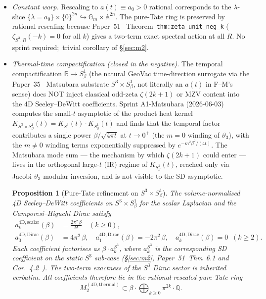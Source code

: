 \documentclass[11pt,a4paper]{article}
\theoremstyle{plain}
\newtheorem{proposition}[theorem]{Proposition}
\theoremstyle{definition}
\newcommand{\sthree}{S^{3}}
\newcommand{\R}{\mathbb{R}}
\newcommand{\Q}{\mathbb{Q}}
\begin{document}
\begin{itemize}
  \item \textit{Constant warp.}  Rescaling to $a(t) \equiv a_0 > 0$
    rational corresponds to the $\lambda$-slice
    $\{\lambda = a_0\} \times \{0\}^{2n} \hookrightarrow
    \mathbb{G}_m \times \mathbb{A}^{2n}$.  The pure-Tate ring is preserved
    by rational rescaling because Paper~51~\cite{loutey_paper51}
    Theorem~\texttt{thm:zeta\_unit\_neg\_k} ($\zeta_{\sthree, R}(-k) = 0$
    for all $k$) gives a two-term exact spectral action at all $R$.  No
    sprint required;\ trivial corollary of \S\ref{sec:m2}.
  \item \textit{Thermal-time compactification (closed in the negative).}
    The temporal compactification $\R \to S^1_\beta$ (the natural GeoVac
    time-direction surrogate via the Paper~35~\cite{loutey_paper35} Matsubara
    substrate $\sthree \times S^1_\beta$, not literally an $a(t)$ in F--M's
    sense) does NOT inject classical odd-zeta $\zeta(2k+1)$ or MZV content
    into the 4D Seeley--DeWitt coefficients.  Sprint A1-Matsubara
    (2026-06-03) computes the
    small-$t$ asymptotic of the product heat kernel
    $K_{\sthree \times S^1_\beta}(t) = K_{\sthree}(t) \cdot K_{S^1_\beta}(t)$
    and finds that the temporal factor contributes a single power
    $\beta/\sqrt{4\pi t}$ at $t \to 0^+$ (the $m = 0$ winding of
    $\vartheta_3$), with the $m \neq 0$ winding terms exponentially
    suppressed by $e^{-m^2\beta^2/(4t)}$.  The Matsubara mode sum --- the
    mechanism by which $\zeta(2k+1)$ could enter --- lives in the orthogonal
    large-$t$ (IR) regime of $K_{S^1_\beta}(t)$, reached only via Jacobi
    $\vartheta_3$ modular inversion, and is not visible to the SD
    asymptotic.

    \begin{proposition}[Pure-Tate refinement on $\sthree \times S^1_\beta$]
    \label{prop:thermal_pure_tate}
    The volume-normalised 4D Seeley--DeWitt coefficients on
    $\sthree \times S^1_\beta$ for the scalar Laplacian and the
    Camporesi--Higuchi Dirac satisfy
    \begin{align}
    a_k^{\mathrm{4D, scalar}}(\beta) &= \frac{2\pi^2\,\beta}{k!} \quad (k \ge 0), \\
    a_0^{\mathrm{4D, Dirac}}(\beta)  &= 4\pi^2\,\beta, \quad
    a_1^{\mathrm{4D, Dirac}}(\beta)  = -2\pi^2\,\beta, \quad
    a_k^{\mathrm{4D, Dirac}}(\beta)  = 0 \;\; (k \ge 2).
    \end{align}
    Each coefficient factorises as $\beta\cdot a_k^{\sthree}$, where
    $a_k^{\sthree}$ is the corresponding SD coefficient on the static
    $\sthree$ sub-case (\S\ref{sec:m2}, Paper~51~Thm~6.1 and
    Cor.~4.2~\cite{loutey_paper51}).  The two-term exactness of the
    $\sthree$ Dirac sector is inherited verbatim.  All coefficients
    therefore lie in the rational-rescaled pure-Tate ring
    \[
    M_2^{\mathrm{(4D, thermal)}} \subset \beta\cdot
    \bigoplus_{k \ge 0} \pi^{2k}\cdot\Q.
    \]
    \end{proposition}


\end{itemize}
\end{document}
